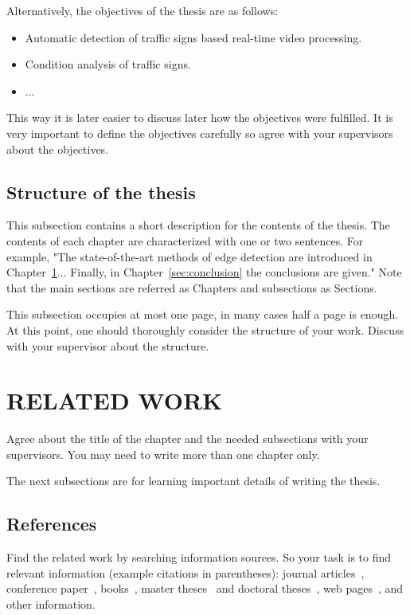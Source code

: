 \documentclass{lutmscthesis}[2017/10/03]
\begin{document}
Alternatively, the objectives of the thesis are as follows:
\begin{itemize}
\item Automatic detection of traffic signs based real-time video processing. 
\item Condition analysis of traffic signs.  
\item ...
\end{itemize}

This way it is later easier to discuss later how the objectives were fulfilled. It is very important to define the objectives carefully so agree with your supervisors about the objectives.  

\subsection{Structure of the thesis}

This subsection contains a short description for the contents of the thesis. 
The contents of each chapter are characterized with one or two sentences. 
For example, "The state-of-the-art methods of edge detection are introduced in Chapter~\ref{sec:related}... Finally, in Chapter~\ref{sec:conclusion} the conclusions are given." 
Note that the main sections are referred as Chapters and subsections as Sections.

This subsection occupies at most one page, in many cases half a page is enough. At this point, one should thoroughly consider the structure of your work. Discuss with your supervisor about the structure.  

\section{RELATED WORK}
\label{sec:related}

Agree about the title of the chapter and the needed subsections with your supervisors. 
You may need to write more than one chapter only. 

The next subsections are for learning important details of writing the thesis. 

\subsection{References}

Find the related work by searching information sources. 
So your task is to find relevant information (example citations in parentheses): 
journal articles~\cite{hamouz2005feature}, 
conference paper~\cite{zafari2017comparison}, 
books~\cite{GonWoo:2002}, 
master theses~\cite{Lyubanenko2017MScThesis} and doctoral theses~\cite{strokina2013phdthesis}, 
web pages~\cite{lutstudyportal}, 
and other information.
\end{document}
